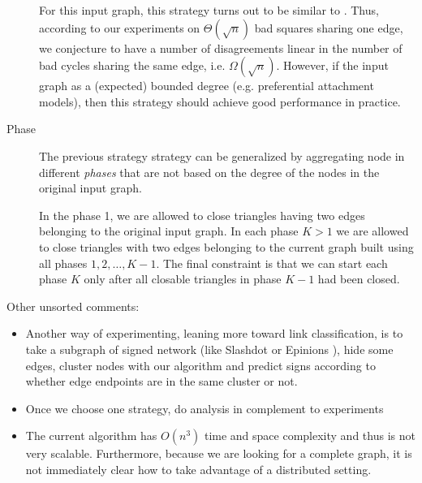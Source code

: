 \begin{description}
	For this input graph, this strategy turns out to be similar to \pat{}.
	Thus, according to our experiments on $\Theta(\sqrt n)$ bad squares
	sharing one edge, we conjecture to have a number of disagreements linear
	in the number of bad cycles sharing the same edge, i.e.
	$\Omega(\sqrt{n})$. However, if the input graph as a (expected) bounded
	degree (e.g. preferential attachment models), then this strategy should
	achieve good performance in practice.

	\item[Phase] The previous strategy strategy can be generalized by
		aggregating node in different \emph{phases} that are not based on the
		degree of the nodes in the original input graph.

		In the phase 1, we are allowed to close triangles having two edges
		belonging to the original input graph. In each phase $K>1$ we are
		allowed to close triangles with two edges belonging to the current
		graph built using all phases $1,2, \ldots, K-1$. The final constraint
		is that we can start each phase $K$ only after all closable triangles
		in phase $K-1$ had been closed.
\end{description}

Other unsorted comments:
\begin{itemize}
	\item Another way of experimenting, leaning more toward link classification,
		is to take a subgraph of signed network (like Slashdot or Epinions
		\autocite{Leskovec2010}), hide some edges, cluster nodes with our
		algorithm and predict signs according to whether edge endpoints are in
		the same cluster or not.
	\item Once we choose one strategy, do analysis in complement to
		experiments
	\item The current algorithm has $O(n^3)$ time and space complexity and
		thus is not very scalable. Furthermore, because we are looking for a
		complete graph, it is not immediately clear how to take advantage of a
		distributed setting.
\end{itemize}

